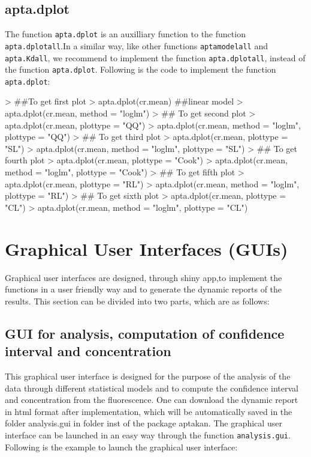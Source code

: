 \documentclass[11pt]{article}
\newcommand{\code}[1]{{\tt #1}}
\begin{document}
\subsection{apta.dplot}
The function \code{apta.dplot} is an auxilliary function to the function \code{apta.dplotall}.In a
similar way, like other functions \code{aptamodelall} and \code{apta.Kdall}, we recommend to
implement the function \code{apta.dplotall}, instead of the function \code{apta.dplot}. Following is
the code to implement the function \code{apta.dplot}:

\begin{Schunk}
\begin{Sinput}
> ##To get first plot
> apta.dplot(cr.mean)  ##linear model
> apta.dplot(cr.mean, method = "loglm")
> ## To get second plot
> apta.dplot(cr.mean, plottype = "QQ")
> apta.dplot(cr.mean, method = "loglm", plottype = "QQ")
> ## To get third plot
> apta.dplot(cr.mean, plottype = "SL")
> apta.dplot(cr.mean, method = "loglm", plottype = "SL")
> ## To get fourth plot
> apta.dplot(cr.mean, plottype = "Cook")
> apta.dplot(cr.mean, method = "loglm", plottype = "Cook")
> ## To get fifth plot
> apta.dplot(cr.mean, plottype = "RL")
> apta.dplot(cr.mean, method = "loglm", plottype = "RL")
> ## To get sixth plot
> apta.dplot(cr.mean, plottype = "CL")
> apta.dplot(cr.mean, method = "loglm", plottype = "CL")
\end{Sinput}
\end{Schunk}


\section{Graphical User Interfaces (GUIs)}
Graphical user interfaces are designed, through shiny app,to implement the functions in
a user friendly way and to generate the dynamic reports of the results. This section can
be divided into two parts, which are as follows:
\subsection{GUI for analysis, computation of confidence interval and concentration}
This graphical user interface is designed for the purpose of the analysis of the data through
different statistical models and to compute the confidence interval and concentration from
the fluorescence. One can download the dynamic report in html format after implementation, which
will be automatically saved in the folder analysis.gui in folder inst of the package aptakan. The
graphical user interface can be launched in an easy way through the function \code{analysis.gui}.
Following is the example to launch the graphical user interface:
\end{document}
